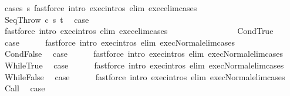 \begin{isabellebody}
\ {\isacharparenleft}cases\ s{\isacharparenright}\ {\isacharparenleft}fastforce\ intro{\isacharcolon}\ exec{\isachardot}intros\ elim{\isacharcolon}\ exec{\isacharunderscore}elim{\isacharunderscore}cases{\isacharparenright}{\isacharplus}\ \ \ \ \ \ \isanewline
{}\isamarkupfalse%
\isanewline
\ \ \isamarkupfalse%
\ {\isacharparenleft}SeqThrow\ c\ s\ t{\isacharparenright}\ \isamarkupfalse%
\ {\isacharquery}case\isanewline
\ \ \ \ \isamarkupfalse%
\ {\isacharparenleft}fastforce\ intro{\isacharcolon}\ exec{\isachardot}intros\ elim{\isacharcolon}\ exec{\isacharunderscore}elim{\isacharunderscore}cases{\isacharparenright}{\isacharplus}\ \ \ \ \ \ \isanewline
{}\isamarkupfalse%
\ \ \ \ \ \ \isanewline
\ \ \isamarkupfalse%
\ CondTrue\ \isamarkupfalse%
\ {\isacharquery}case\isanewline
\ \ \ \ \isamarkupfalse%
\ {\isacharparenleft}fastforce\ intro{\isacharcolon}\ exec{\isachardot}intros\ elim{\isacharcolon}\ exec{\isacharunderscore}Normal{\isacharunderscore}elim{\isacharunderscore}cases{\isacharparenright}\isanewline
{}\isamarkupfalse%
\ \ \ \ \ \ \isanewline
\ \ \isamarkupfalse%
\ CondFalse\ \isamarkupfalse%
\ {\isacharquery}case\isanewline
\ \ \ \ \isamarkupfalse%
\ {\isacharparenleft}fastforce\ intro{\isacharcolon}\ exec{\isachardot}intros\ elim{\isacharcolon}\ exec{\isacharunderscore}Normal{\isacharunderscore}elim{\isacharunderscore}cases{\isacharparenright}\isanewline
{}\isamarkupfalse%
\isanewline
\ \ \isamarkupfalse%
\ WhileTrue\ \isamarkupfalse%
\ {\isacharquery}case\isanewline
\ \ \ \ \isamarkupfalse%
\ {\isacharparenleft}fastforce\ intro{\isacharcolon}\ exec{\isachardot}intros\ elim{\isacharcolon}\ exec{\isacharunderscore}Normal{\isacharunderscore}elim{\isacharunderscore}cases{\isacharparenright}\isanewline
{}\isamarkupfalse%
\isanewline
\ \ \isamarkupfalse%
\ WhileFalse\ \isamarkupfalse%
\ {\isacharquery}case\isanewline
\ \ \ \ \isamarkupfalse%
\ {\isacharparenleft}fastforce\ intro{\isacharcolon}\ exec{\isachardot}intros\ elim{\isacharcolon}\ exec{\isacharunderscore}Normal{\isacharunderscore}elim{\isacharunderscore}cases{\isacharparenright}\isanewline
{}\isamarkupfalse%
\isanewline
\ \ \isamarkupfalse%
\ Call\ \isamarkupfalse%
\ {\isacharquery}case\isanewline
\ \ \ \ \isamarkupfalse%

\end{isabellebody}
